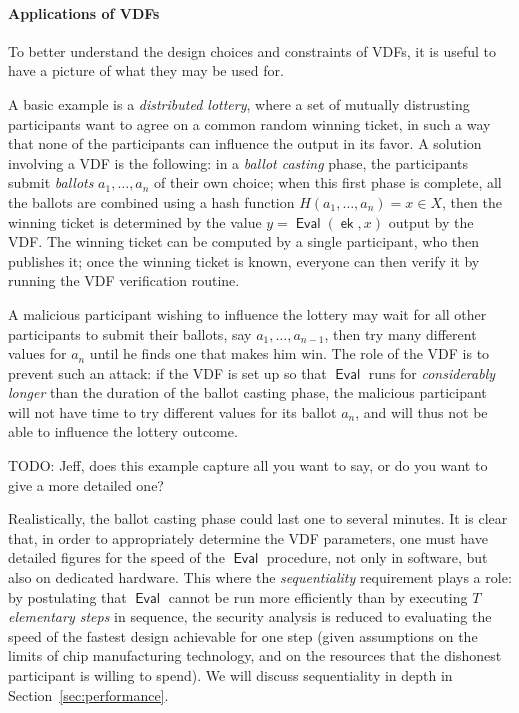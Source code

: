 \documentclass{article}
\DeclareMathOperator{\Eval}{\mathsf{Eval}}
\DeclareMathOperator{\ek}{\mathsf{ek}}
\begin{document}
\paragraph{Applications of VDFs}
To better understand the design choices and constraints of VDFs, it is
useful to have a picture of what they may be used for. %

A basic example is a \emph{distributed lottery}, where a set of
mutually distrusting participants want to agree on a common random
winning ticket, in such a way that none of the participants can
influence the output in its favor. %
A solution involving a VDF is the following: in a \emph{ballot
  casting} phase, the participants submit \emph{ballots}
$a_1,\ldots,a_n$ of their own choice; when this first phase is
complete, all the ballots are combined using a hash function
$H(a_1,\dots,a_n) = x ∈ X$, then the winning ticket is determined by
the value $y = \Eval(\ek,x)$ output by the VDF. %
The winning ticket can be computed by a single participant, who then
publishes it; once the winning ticket is known, everyone can then
verify it by running the VDF verification routine.

A malicious participant wishing to influence the lottery may wait for
all other participants to submit their ballots, say
$a_1,\dots,a_{n-1}$, then try many different values for $a_n$ until he
finds one that makes him win. %
The role of the VDF is to prevent such an attack: if the VDF is set up
so that $\Eval$ runs for \emph{considerably longer} than the duration
of the ballot casting phase, the malicious participant will not have
time to try different values for its ballot $a_n$, and will thus not
be able to influence the lottery outcome.

TODO: Jeff, does this example capture all you want to say, or do you
want to give a more detailed one?

Realistically, the ballot casting phase could last one to several
minutes. %
It is clear that, in order to appropriately determine the VDF
parameters, one must have detailed figures for the speed of the
$\Eval$ procedure, not only in software, but also on dedicated
hardware. %
This where the \emph{sequentiality} requirement plays a role: by
postulating that $\Eval$ cannot be run more efficiently than by
executing $T$ \emph{elementary steps} in sequence, the security
analysis is reduced to evaluating the speed of the fastest design
achievable for one step (given assumptions on the limits of chip
manufacturing technology, and on the resources that the dishonest
participant is willing to spend). %
We will discuss sequentiality in depth in
Section~\ref{sec:performance}.
\end{document}

